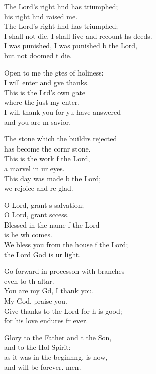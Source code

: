 \begin{psalmverse}
\begin{patverse}
    The Lord’s right hnd has triumphed;\Med\\
    his right hnd raised me.\\
    The Lord’s right hnd has triumphed;\Med\\
    I shall not die, I shall live and recount h\pointup{\i}s deeds.\\
    I was punished, I was punished b the Lord,\Med\\
    but not doomed t die.

    Open to me the gtes of holiness:\Med\\
    I will enter and g\pointup{\i}ve thanks.\\
    This is the Lrd’s own gate\Med\\
    where the just my enter.\\
    I will thank you for yu have answered\Med\\
    and you are m savior.

    The stone which the buildrs rejected\Med\\
    has become the cornr stone.\\
    This is the work f the Lord,\Med\\
    a marvel in ur eyes.\\
    This day was made b the Lord;\Med\\
    we rejoice and re glad.

    O Lord, grant s salvation;\Med\\
    O Lord, grant sccess.\\
    Blessed in the name f the Lord\Med\\
    is he wh comes.\\
    We bless you from the house f the Lord;\Med\\
    the Lord God is ur light.

    Go forward in process\pointup{\i}on with branches\Med\\
    even to th altar.\\
    You are my Gd, I thank you.\Med\\
    My God,  praise you.\\
    Give thanks to the Lord for h is good;\Med\\
    for his love endures fr ever.

    Glory to the Father and t the Son,\Med\\
    and to the Hol Spirit:\\
    as it was in the beginn\pointup{\i}ng, is now,\Med\\
    and will be forever. men.
  \end{patverse}
\end{psalmverse}
